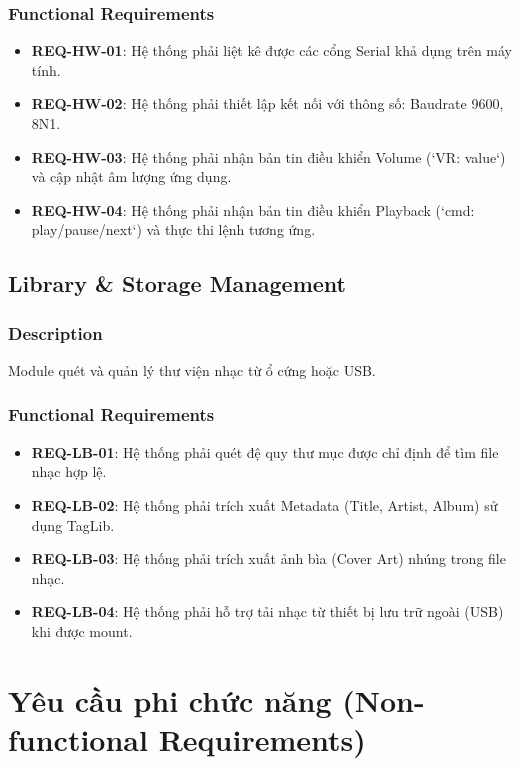 \documentclass{article}
\begin{document}
\subsubsection{Functional Requirements}
\begin{itemize}
    \item \textbf{REQ-HW-01}: Hệ thống phải liệt kê được các cổng Serial khả dụng trên máy tính.
    \item \textbf{REQ-HW-02}: Hệ thống phải thiết lập kết nối với thông số: Baudrate 9600, 8N1.
    \item \textbf{REQ-HW-03}: Hệ thống phải nhận bản tin điều khiển Volume (`VR: value`) và cập nhật âm lượng ứng dụng.
    \item \textbf{REQ-HW-04}: Hệ thống phải nhận bản tin điều khiển Playback (`cmd: play/pause/next`) và thực thi lệnh tương ứng.
\end{itemize}

\subsection{Library \& Storage Management}
\subsubsection{Description}
Module quét và quản lý thư viện nhạc từ ổ cứng hoặc USB.

\subsubsection{Functional Requirements}
\begin{itemize}
    \item \textbf{REQ-LB-01}: Hệ thống phải quét đệ quy thư mục được chỉ định để tìm file nhạc hợp lệ.
    \item \textbf{REQ-LB-02}: Hệ thống phải trích xuất Metadata (Title, Artist, Album) sử dụng TagLib.
    \item \textbf{REQ-LB-03}: Hệ thống phải trích xuất ảnh bìa (Cover Art) nhúng trong file nhạc.
    \item \textbf{REQ-LB-04}: Hệ thống phải hỗ trợ tải nhạc từ thiết bị lưu trữ ngoài (USB) khi được mount.
\end{itemize}

\newpage


\newpage
\section{Yêu cầu phi chức năng (Non-functional Requirements)}
\end{document}

